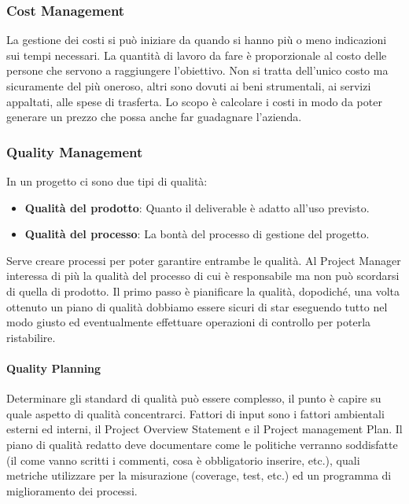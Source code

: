 \subsubsection{Cost Management}
La gestione dei costi si può iniziare da quando si hanno più o meno indicazioni sui tempi necessari. La quantità di lavoro da fare è proporzionale al costo delle persone che servono a raggiungere l'obiettivo. Non si tratta dell'unico costo ma sicuramente del più oneroso, altri sono dovuti ai beni strumentali, ai servizi appaltati, alle spese di trasferta.\newline
Lo scopo è calcolare i costi in modo da poter generare un prezzo che possa anche far guadagnare l'azienda.\newline
\subsubsection{Quality Management}
In un progetto ci sono due tipi di qualità:
\begin{itemize}
	\item \textbf{Qualità del prodotto}: Quanto il deliverable è adatto all'uso previsto.
	\item \textbf{Qualità del processo}: La bontà del processo di gestione del progetto.
\end{itemize}
Serve creare processi per poter garantire entrambe le qualità. Al Project Manager interessa di più la qualità del processo di cui è responsabile ma non può scordarsi di quella di prodotto.\newline
Il primo passo è pianificare la qualità, dopodiché, una volta ottenuto un piano di qualità dobbiamo essere sicuri di star eseguendo tutto nel modo giusto ed eventualmente effettuare operazioni di controllo per poterla ristabilire.
\paragraph{Quality Planning}
Determinare gli standard di qualità può essere complesso, il punto è capire su quale aspetto di qualità concentrarci. Fattori di input sono i fattori ambientali esterni ed interni, il Project Overview Statement e il Project management Plan.\newline
Il piano di qualità redatto deve documentare come le politiche verranno soddisfatte (il come vanno scritti i commenti, cosa è obbligatorio inserire, etc.), quali metriche utilizzare per la misurazione (coverage, test, etc.) ed un programma di miglioramento dei processi.
